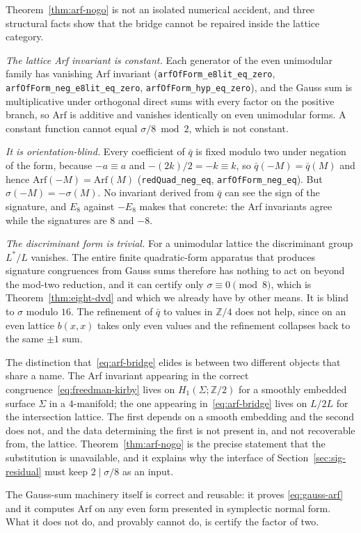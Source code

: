 Theorem~\ref{thm:arf-nogo} is not an isolated numerical accident, and
three structural facts show that the bridge cannot be repaired inside the
lattice category.

\emph{The lattice Arf invariant is constant.} Each generator of the even
unimodular family has vanishing Arf invariant
(\texttt{arfOfForm\_e8lit\_eq\_zero},
\texttt{arfOfForm\_neg\_e8lit\_eq\_zero},
\texttt{arfOfForm\_hyp\_eq\_zero}), and the Gauss sum is multiplicative
under orthogonal direct sums with every factor on the positive branch, so
$\mathrm{Arf}$ is additive and vanishes identically on even unimodular
forms. A constant function cannot equal $\sigma/8 \bmod 2$, which is not
constant.

\emph{It is orientation-blind.} Every coefficient of $\bar q$ is fixed
modulo two under negation of the form, because $-a \equiv a$ and
$-(2k)/2 = -k \equiv k$, so $\bar q(-M) = \bar q(M)$ and hence
$\mathrm{Arf}(-M) = \mathrm{Arf}(M)$
(\texttt{redQuad\_neg\_eq}, \texttt{arfOfForm\_neg\_eq}). But
$\sigma(-M) = -\sigma(M)$. No invariant derived from $\bar q$ can see the
sign of the signature, and $E_8$ against $-E_8$ makes that concrete: the
Arf invariants agree while the signatures are $8$ and $-8$.

\emph{The discriminant form is trivial.} For a unimodular lattice the
discriminant group $L^{*}/L$ vanishes. The entire finite quadratic-form
apparatus that produces signature congruences from Gauss sums therefore
has nothing to act on beyond the mod-two reduction, and it can certify
only $\sigma \equiv 0 \pmod 8$, which is Theorem~\ref{thm:eight-dvd} and
which we already have by other means. It is blind to $\sigma$ modulo
$16$. The refinement of $\bar q$ to values in $\mathbb{Z}/4$ does not
help, since on an even lattice $b(x,x)$ takes only even values and the
refinement collapses back to the same $\pm 1$ sum.

The distinction that~\eqref{eq:arf-bridge} elides is between two
different objects that share a name. The Arf invariant appearing in the
correct congruence~\eqref{eq:freedman-kirby} lives on
$H_1(\Sigma;\mathbb{Z}/2)$ for a smoothly embedded surface $\Sigma$ in a
$4$-manifold; the one appearing in~\eqref{eq:arf-bridge} lives on
$L/2L$ for the intersection lattice. The first depends on a smooth
embedding and the second does not, and the data determining the first is
not present in, and not recoverable from, the lattice.
Theorem~\ref{thm:arf-nogo} is the precise statement that the substitution
is unavailable, and it explains why the interface of
Section~\ref{sec:sig-residual} must keep $2\mid\sigma/8$ as an input.

The Gauss-sum machinery itself is correct and reusable: it proves
\eqref{eq:gauss-arf} and it computes $\mathrm{Arf}$ on any even form
presented in symplectic normal form. What it does not do, and provably
cannot do, is certify the factor of two.
